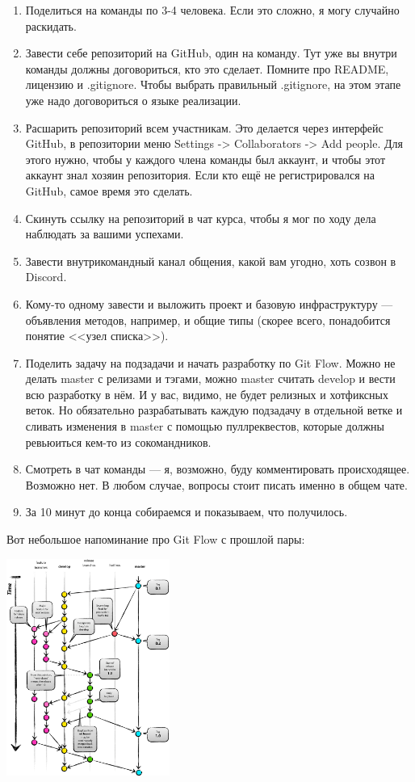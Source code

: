 \documentclass{../../text-style}
\begin{document}
\begin{enumerate}
    \item Поделиться на команды по 3-4 человека. Если это сложно, я могу случайно раскидать.
    \item Завести себе репозиторий на GitHub, один на команду. Тут уже вы внутри команды должны договориться, кто это сделает. Помните про README, лицензию и .gitignore. Чтобы выбрать правильный .gitignore, на этом этапе уже надо договориться о языке реализации.
    \item Расшарить репозиторий всем участникам. Это делается через интерфейс GitHub, в репозитории меню Settings -> Collaborators -> Add people. Для этого нужно, чтобы у каждого члена команды был аккаунт, и чтобы этот аккаунт знал хозяин репозитория. Если кто ещё не регистрировался на GitHub, самое время это сделать.
    \item Скинуть ссылку на репозиторий в чат курса, чтобы я мог по ходу дела наблюдать за вашими успехами.
    \item Завести внутрикомандный канал общения, какой вам угодно, хоть созвон в Discord.
    \item Кому-то одному завести и выложить проект и базовую инфраструктуру --- объявления методов, например, и общие типы (скорее всего, понадобится понятие <<узел списка>>).
    \item Поделить задачу на подзадачи и начать разработку по Git Flow. Можно не делать master с релизами и тэгами, можно master считать develop и вести всю разработку в нём. И у вас, видимо, не будет релизных и хотфиксных веток. Но обязательно разрабатывать каждую подзадачу в отдельной ветке и сливать изменения в master с помощью пуллреквестов, которые должны ревьюиться кем-то из сокомандников.
    \item Смотреть в чат команды --- я, возможно, буду комментировать происходящее. Возможно нет. В любом случае, вопросы стоит писать именно в общем чате.
    \item За 10 минут до конца собираемся и показываем, что получилось.
\end{enumerate}

Вот небольшое напоминание про Git Flow с прошлой пары:

\begin{center}
    \includegraphics[width=0.4\textwidth]{gitFlow.png}
\end{center}
\end{document}
